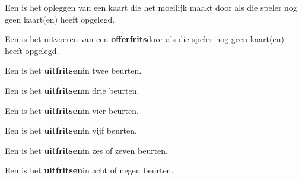 \item Een  is het opleggen van een kaart die het \andereSpelers moeilijk maakt door \Willem als die speler nog geen kaart(en) heeft opgelegd.

\item Een  is het uitvoeren van een \textbf{offerfrits}\footnotemark[3] door \Willem als die speler nog geen kaart(en) heeft opgelegd.

\item Een  is het \textbf{uitfritsen}\footnotemark[3] in twee beurten\footnotemark[4].

\item Een  is het \textbf{uitfritsen}\footnotemark[3] in drie beurten\footnotemark[4].

\item Een  is het \textbf{uitfritsen}\footnotemark[3] in vier beurten\footnotemark[4].

\item Een  is het \textbf{uitfritsen}\footnotemark[3] in vijf beurten\footnotemark[4].

\item Een  is het \textbf{uitfritsen}\footnotemark[3] in zes of zeven beurten.

\item Een  is het \textbf{uitfritsen}\footnotemark[3] in acht of negen beurten.
\eindABCLijst


